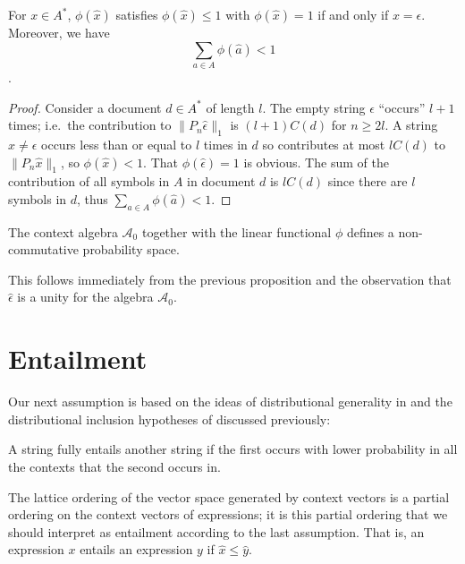 \documentclass[11pt]{report}
\begin{document}
\begin{prop}
For $x \in A^*$, $\phi(\hat{x})$ satisfies $\phi(\hat{x}) \le 1$ with $\phi(\hat{x}) = 1$ if and only if $x = \epsilon$. Moreover, we have
$$\sum_{a \in A} \phi(\hat{a}) < 1$$.
\end{prop}

\begin{proof}
Consider a document $d\in A^*$ of length $l$. The empty string $\epsilon$ ``occurs'' $l+1$ times; i.e.~the contribution to $\|P_n \hat{\epsilon}\|_1$ is $(l+1)C(d)$ for $n \ge 2l$. A string $x \neq \epsilon$ occurs less than or equal to $l$ times in $d$ so contributes at most $lC(d)$ to $\|P_n\hat{x}\|_1$, so $\phi(\hat{x}) < 1$. That $\phi(\hat{\epsilon}) = 1$ is obvious. The sum of the contribution of all symbols in $A$ in document $d$ is $lC(d)$ since there are $l$ symbols in $d$, thus $\sum_{a \in A} \phi(\hat{a}) < 1$.
\end{proof}

\begin{prop}
The context algebra $\mathcal{A}_0$ together with the linear functional $\phi$ defines a non-commutative probability space.
\end{prop}

This follows immediately from the previous proposition and the observation that $\hat{\epsilon}$ is a unity for the algebra $\mathcal{A}_0$.

\section{Entailment}


Our next assumption is based on the ideas of distributional generality in \citep{Weeds:04} and the distributional inclusion hypotheses of \cite{Geffet:05} discussed previously:
\begin{assumption} A string fully entails another string if the first occurs with lower probability in all the contexts that the second occurs in.
\end{assumption}\noindent
The lattice ordering of the vector space generated by context vectors is a partial ordering on the context vectors of expressions; it is this partial ordering that we should interpret as entailment according to the last assumption. That is, an expression $x$ entails an expression $y$ if $\hat{x} \le \hat{y}$.
\end{document}
